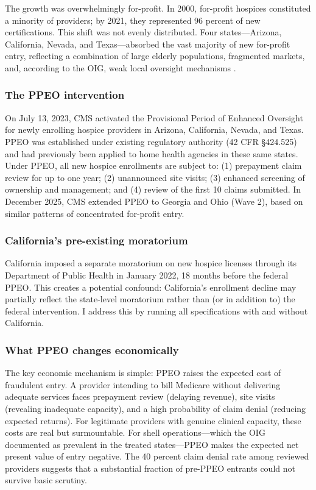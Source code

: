 \documentclass[12pt]{article}
\begin{document}
The growth was overwhelmingly for-profit. In 2000, for-profit hospices constituted a minority of providers; by 2021, they represented 96 percent of new certifications. This shift was not evenly distributed. Four states---Arizona, California, Nevada, and Texas---absorbed the vast majority of new for-profit entry, reflecting a combination of large elderly populations, fragmented markets, and, according to the OIG, weak local oversight mechanisms \citep{oig2023}.

\subsubsection*{The PPEO intervention} On July 13, 2023, CMS activated the Provisional Period of Enhanced Oversight for newly enrolling hospice providers in Arizona, California, Nevada, and Texas. PPEO was established under existing regulatory authority (42 CFR \S424.525) and had previously been applied to home health agencies in these same states. Under PPEO, all new hospice enrollments are subject to: (1) prepayment claim review for up to one year; (2) unannounced site visits; (3) enhanced screening of ownership and management; and (4) review of the first 10 claims submitted. In December 2025, CMS extended PPEO to Georgia and Ohio (Wave 2), based on similar patterns of concentrated for-profit entry.

\subsubsection*{California's pre-existing moratorium} California imposed a separate moratorium on new hospice licenses through its Department of Public Health in January 2022, 18 months before the federal PPEO. This creates a potential confound: California's enrollment decline may partially reflect the state-level moratorium rather than (or in addition to) the federal intervention. I address this by running all specifications with and without California.

\subsubsection*{What PPEO changes economically} The key economic mechanism is simple: PPEO raises the expected cost of fraudulent entry. A provider intending to bill Medicare without delivering adequate services faces prepayment review (delaying revenue), site visits (revealing inadequate capacity), and a high probability of claim denial (reducing expected returns). For legitimate providers with genuine clinical capacity, these costs are real but surmountable. For shell operations---which the OIG documented as prevalent in the treated states---PPEO makes the expected net present value of entry negative. The 40 percent claim denial rate among reviewed providers suggests that a substantial fraction of pre-PPEO entrants could not survive basic scrutiny.
\end{document}
